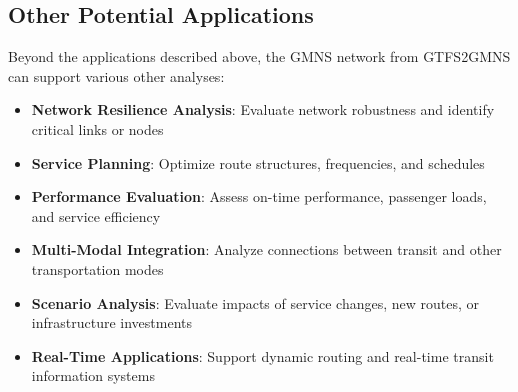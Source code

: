 \documentclass[11pt,a4paper]{article}
\begin{document}
\subsection{Other Potential Applications}

Beyond the applications described above, the GMNS network from GTFS2GMNS can support various other analyses:

\begin{itemize}
    \item \textbf{Network Resilience Analysis}: Evaluate network robustness and identify critical links or nodes
    \item \textbf{Service Planning}: Optimize route structures, frequencies, and schedules
    \item \textbf{Performance Evaluation}: Assess on-time performance, passenger loads, and service efficiency
    \item \textbf{Multi-Modal Integration}: Analyze connections between transit and other transportation modes
    \item \textbf{Scenario Analysis}: Evaluate impacts of service changes, new routes, or infrastructure investments
    \item \textbf{Real-Time Applications}: Support dynamic routing and real-time transit information systems
\end{itemize}
\end{document}
